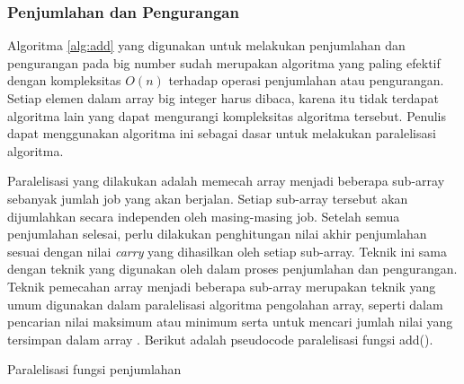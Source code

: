     \subsubsection{Penjumlahan dan Pengurangan}\label{sec:add_sub_parallel}
      Algoritma \ref{alg:add} yang digunakan untuk melakukan penjumlahan dan pengurangan pada big number sudah merupakan algoritma yang paling efektif dengan kompleksitas $O(n)$ terhadap operasi penjumlahan atau pengurangan. Setiap elemen dalam array big integer harus dibaca, karena itu tidak terdapat algoritma lain yang dapat mengurangi kompleksitas algoritma tersebut. Penulis dapat menggunakan algoritma ini sebagai dasar untuk melakukan paralelisasi algoritma.

      Paralelisasi yang dilakukan adalah memecah array menjadi beberapa sub-array sebanyak jumlah job yang akan berjalan. Setiap sub-array tersebut akan dijumlahkan secara independen oleh masing-masing job. Setelah semua penjumlahan selesai, perlu dilakukan penghitungan nilai akhir penjumlahan sesuai dengan nilai \textit{carry} yang dihasilkan oleh setiap sub-array. Teknik ini sama dengan teknik yang digunakan oleh \citet{gpu_bignum} dalam proses penjumlahan dan pengurangan. Teknik pemecahan array menjadi beberapa sub-array merupakan teknik yang umum digunakan dalam paralelisasi algoritma pengolahan array, seperti dalam pencarian nilai maksimum atau minimum serta untuk mencari jumlah nilai yang tersimpan dalam array \citep{intro_parallel}. Berikut adalah pseudocode paralelisasi fungsi add().

      \begin{algorithm}
          \caption{Paralelisasi fungsi penjumlahan}
          \label{alg:parallel_add}
          \begin{algorithmic}[1]
            \Statex
                  \State {}
              \EndFor
              \State {}
            \EndFunction
          \end{algorithmic}
      \end{algorithm}

